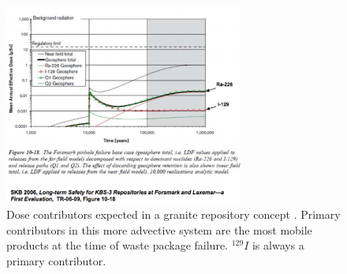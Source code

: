 \begin{figure}[htbp!]
  \begin{center}
    \includegraphics[width=0.7\textwidth]{./images/swift_granite_dose.eps}
  \end{center}
  \caption{Dose contributors expected in a granite repository concept 
    \cite{swift_applying_2010}. Primary contributors in this more advective 
  system are the most mobile products at the time of waste package failure. 
  $^{129}I$ is always a primary contributor.}
  \label{fig:swift_granite_dose}
\end{figure}
